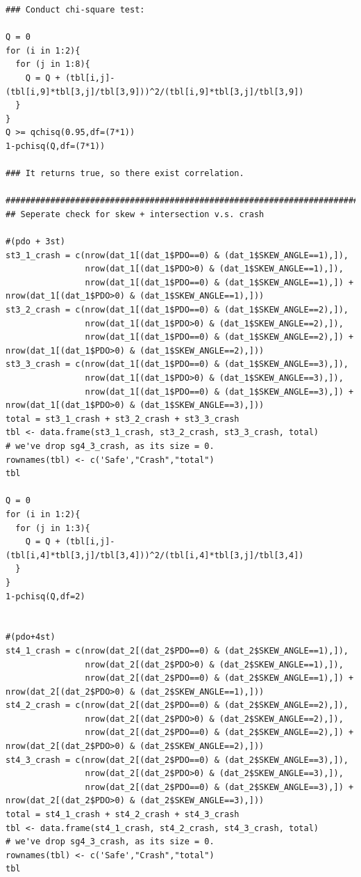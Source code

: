 \documentclass[11pt]{scrartcl} %
\begin{document}
\begin{lstlisting}
### Conduct chi-square test:

Q = 0
for (i in 1:2){
  for (j in 1:8){
    Q = Q + (tbl[i,j]-(tbl[i,9]*tbl[3,j]/tbl[3,9]))^2/(tbl[i,9]*tbl[3,j]/tbl[3,9])
  }
}
Q >= qchisq(0.95,df=(7*1))
1-pchisq(Q,df=(7*1))

### It returns true, so there exist correlation.

##################################################################################
## Seperate check for skew + intersection v.s. crash

#(pdo + 3st)
st3_1_crash = c(nrow(dat_1[(dat_1$PDO==0) & (dat_1$SKEW_ANGLE==1),]),
                nrow(dat_1[(dat_1$PDO>0) & (dat_1$SKEW_ANGLE==1),]),
                nrow(dat_1[(dat_1$PDO==0) & (dat_1$SKEW_ANGLE==1),]) + nrow(dat_1[(dat_1$PDO>0) & (dat_1$SKEW_ANGLE==1),]))
st3_2_crash = c(nrow(dat_1[(dat_1$PDO==0) & (dat_1$SKEW_ANGLE==2),]),
                nrow(dat_1[(dat_1$PDO>0) & (dat_1$SKEW_ANGLE==2),]),
                nrow(dat_1[(dat_1$PDO==0) & (dat_1$SKEW_ANGLE==2),]) + nrow(dat_1[(dat_1$PDO>0) & (dat_1$SKEW_ANGLE==2),]))
st3_3_crash = c(nrow(dat_1[(dat_1$PDO==0) & (dat_1$SKEW_ANGLE==3),]),
                nrow(dat_1[(dat_1$PDO>0) & (dat_1$SKEW_ANGLE==3),]),
                nrow(dat_1[(dat_1$PDO==0) & (dat_1$SKEW_ANGLE==3),]) + nrow(dat_1[(dat_1$PDO>0) & (dat_1$SKEW_ANGLE==3),]))
total = st3_1_crash + st3_2_crash + st3_3_crash
tbl <- data.frame(st3_1_crash, st3_2_crash, st3_3_crash, total)
# we've drop sg4_3_crash, as its size = 0.
rownames(tbl) <- c('Safe',"Crash","total")
tbl

Q = 0
for (i in 1:2){
  for (j in 1:3){
    Q = Q + (tbl[i,j]-(tbl[i,4]*tbl[3,j]/tbl[3,4]))^2/(tbl[i,4]*tbl[3,j]/tbl[3,4])
  }
}
1-pchisq(Q,df=2)


#(pdo+4st)
st4_1_crash = c(nrow(dat_2[(dat_2$PDO==0) & (dat_2$SKEW_ANGLE==1),]),
                nrow(dat_2[(dat_2$PDO>0) & (dat_2$SKEW_ANGLE==1),]),
                nrow(dat_2[(dat_2$PDO==0) & (dat_2$SKEW_ANGLE==1),]) + nrow(dat_2[(dat_2$PDO>0) & (dat_2$SKEW_ANGLE==1),]))
st4_2_crash = c(nrow(dat_2[(dat_2$PDO==0) & (dat_2$SKEW_ANGLE==2),]),
                nrow(dat_2[(dat_2$PDO>0) & (dat_2$SKEW_ANGLE==2),]),
                nrow(dat_2[(dat_2$PDO==0) & (dat_2$SKEW_ANGLE==2),]) + nrow(dat_2[(dat_2$PDO>0) & (dat_2$SKEW_ANGLE==2),]))
st4_3_crash = c(nrow(dat_2[(dat_2$PDO==0) & (dat_2$SKEW_ANGLE==3),]),
                nrow(dat_2[(dat_2$PDO>0) & (dat_2$SKEW_ANGLE==3),]),
                nrow(dat_2[(dat_2$PDO==0) & (dat_2$SKEW_ANGLE==3),]) + nrow(dat_2[(dat_2$PDO>0) & (dat_2$SKEW_ANGLE==3),]))
total = st4_1_crash + st4_2_crash + st4_3_crash
tbl <- data.frame(st4_1_crash, st4_2_crash, st4_3_crash, total)
# we've drop sg4_3_crash, as its size = 0.
rownames(tbl) <- c('Safe',"Crash","total")
tbl


\end{lstlisting}
\end{document}
